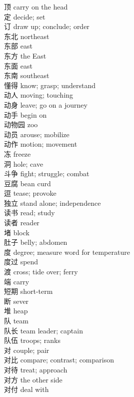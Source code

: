 顶 \quad carry on the head\\
定 \quad decide; set\\
订 \quad draw up; conclude; order\\
东北 \quad northeast\\
东部 \quad east\\
东方 \quad the East\\
东面 \quad east\\
东南 \quad southeast\\
懂得 \quad know; grasp; understand\\
动人 \quad moving; touching\\
动身 \quad leave; go on a journey\\
动手 \quad begin on\\
动物园 \quad zoo\\
动员 \quad arouse; mobilize\\
动作 \quad motion; movement\\
冻 \quad freeze\\
洞 \quad hole; cave\\
斗争 \quad fight; struggle; combat\\
豆腐 \quad bean curd\\
逗 \quad tease; provoke\\
独立 \quad stand alone; independence\\
读书 \quad read; study\\
读者 \quad reader\\
堵 \quad block\\
肚子 \quad belly; abdomen\\
度 \quad degree; measure word for temperature\\
度过 \quad spend\\
渡 \quad cross; tide over; ferry\\
端 \quad carry\\
短期 \quad short-term\\
断 \quad sever\\
堆 \quad heap\\
队 \quad team\\
队长 \quad team leader; captain\\
队伍 \quad troops; ranks\\
对 \quad couple; pair\\
对比 \quad compare; contrast; comparison\\
对待 \quad treat; approach\\
对方 \quad the other side\\
对付 \quad deal with\\
